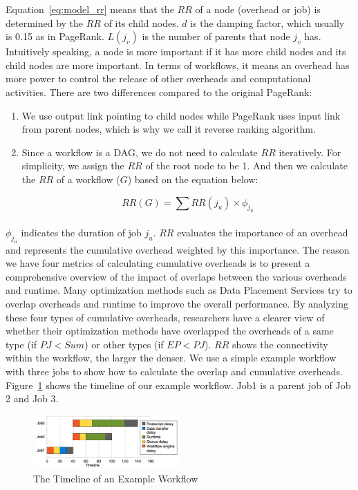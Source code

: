 \documentclass[final,5p,times,twocolumn]{elsarticle}
\begin{document}
Equation~\ref{eq:model_rr} means that the $RR$ of a node (overhead or job) is determined by the $RR$ of its child nodes. $d$ is the damping factor, which usually is 0.15 as in PageRank. $L(j_v)$ is the number of parents that node $j_v$ has. Intuitively speaking, a node is more important if it has more child nodes and its child nodes are more important. In terms of workflows, it means an overhead has more power to control the release of other overheads and computational activities. There are two differences compared to the original PageRank: 
\begin{enumerate}
\item We use output link pointing to child nodes while PageRank uses input link from parent nodes, which is why we call it reverse ranking algorithm.
\item Since a workflow is a DAG, we do not need to calculate $RR$ iteratively. For simplicity, we assign the $RR$ of the root node to be 1. And then we calculate the $RR$ of a workflow ($G$) based on the equation below:

\begin{equation} \label{eq:model_sum_rr}
RR(G)=\sum_{}{}RR(j_u) \times \phi_{j_u}
\end{equation}

\end{enumerate}
 
$\phi_{j_u}$ indicates the duration of job $j_u$.  $RR$ evaluates the importance of an overhead and represents the cumulative overhead weighted by this importance. 
The reason we have four metrics of calculating cumulative overheads is to present a comprehensive overview of the impact of overlaps between the various overheads and runtime. Many optimization methods such as Data Placement Services \cite{Amer2012} try to overlap overheads and runtime to improve the overall performance. By analyzing these four types of cumulative overheads, researchers have a clearer view of whether their optimization methods have overlapped the overheads of a same type (if $PJ < Sum$) or other types (if $EP < PJ$). $RR$ shows the connectivity within the workflow, the larger the denser. 
We use a simple example workflow with three jobs to show how to calculate the overlap and cumulative overheads. Figure~\ref{fig:model_overhead_timeline} shows the timeline of our example workflow. Job1 is a parent job of Job 2 and Job 3.

\begin{figure}[h!]
	\centering
    \includegraphics[width=0.5\textwidth]{figures/model/overhead_timeline.pdf}
    \caption{The Timeline of an Example Workflow}
    \label{fig:model_overhead_timeline}
\end{figure}
\end{document}
